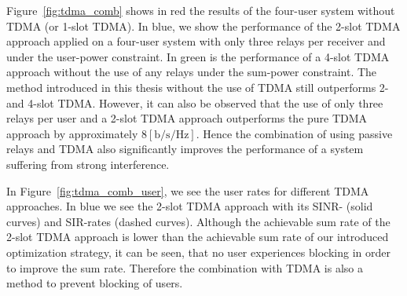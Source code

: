 Figure~\ref{fig:tdma_comb} shows in red the results of the four-user system without TDMA (or 1-slot TDMA).
In blue, we show the performance of the 2-slot TDMA approach applied on a four-user system with only three relays per receiver and under the user-power constraint.
In green is the performance of a 4-slot TDMA approach without the use of any relays under the sum-power constraint.
The method introduced in this thesis without the use of TDMA still outperforms 2- and 4-slot TDMA.
However, it can also be observed that the use of only three relays per user and a 2-slot TDMA approach outperforms the pure TDMA approach by approximately $8 \left[\text{b/s/Hz}\right]$.
Hence the combination of using passive relays and TDMA also significantly improves the performance of a system suffering from strong interference.


In Figure~\ref{fig:tdma_comb_user}, we see the user rates for different TDMA approaches.
In blue we see the 2-slot TDMA approach with its SINR- (solid curves) and SIR-rates (dashed curves).
Although the achievable sum rate of the 2-slot TDMA approach is lower than the achievable sum rate of our introduced optimization strategy, it can be seen, that no user experiences blocking in order to improve the sum rate.
Therefore the combination with TDMA is also a method to prevent blocking of users.



